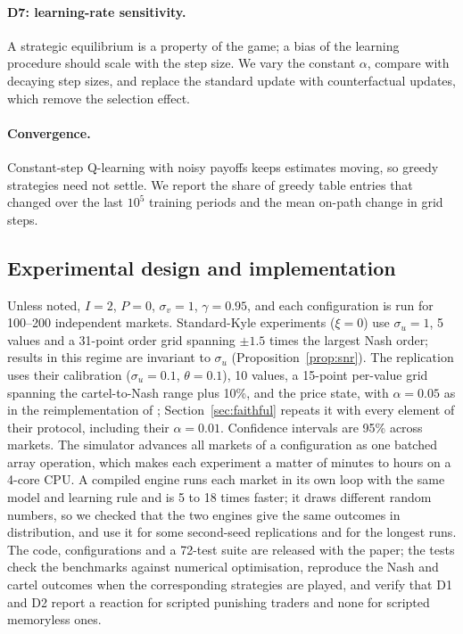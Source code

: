\paragraph{D7: learning-rate sensitivity.} A strategic equilibrium is a
property of the game; a bias of the learning procedure should scale with the
step size. We vary the constant $\alpha$, compare with decaying step sizes,
and replace the standard update with counterfactual updates, which remove the
selection effect.

\paragraph{Convergence.} Constant-step Q-learning with noisy payoffs keeps
estimates moving, so greedy strategies need not settle. We report the share
of greedy table entries that changed over the last $10^5$ training periods and
the mean on-path change in grid steps.

\subsection{Experimental design and implementation}

Unless noted, $I=2$, $P=0$, $\sigma_v=1$, $\gamma=0.95$, and each configuration
is run for 100--200 independent markets. Standard-Kyle experiments
($\xi=0$) use $\sigma_u=1$, 5 values and a 31-point order grid spanning
$\pm1.5$ times the largest Nash order; results in this regime are invariant to
$\sigma_u$ (Proposition~\ref{prop:snr}). The \citet{dou2025} replication uses
their calibration ($\sigma_u=0.1$, $\theta=0.1$), 10 values, a 15-point
per-value grid spanning the cartel-to-Nash range plus 10\%, and the price
state, with $\alpha=0.05$ as in the reimplementation of \citet{esquinas2026};
Section~\ref{sec:faithful} repeats it with every element of their protocol,
including their $\alpha=0.01$. Confidence intervals are 95\% across markets. The simulator
advances all markets of a configuration as one batched array operation, which
makes each experiment a matter of minutes to hours on a 4-core CPU. A
compiled engine runs each market in its own loop with the same model and
learning rule and is 5 to 18 times faster; it draws different random numbers,
so we checked that the two engines give the same outcomes in distribution, and
use it for some second-seed replications and for the longest runs. The code,
configurations and a 72-test suite are released with the paper; the tests
check the benchmarks against numerical optimisation, reproduce the Nash and
cartel outcomes when the corresponding strategies are played, and verify that
D1 and D2 report a reaction for scripted punishing traders and none for
scripted memoryless ones.
